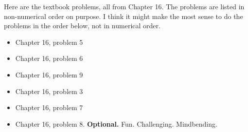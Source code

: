 \documentclass[12pt]{article}
\begin{document}
\noindent Here are the textbook problems, all from Chapter 16.  The
problems are listed in non-numerical order on purpose.  I think it
might make the most sense to do the problems in the order below, not
in numerical order.

\begin{itemize}
  \setlength{\itemsep}{-1mm}
\item Chapter 16, problem 5
\item Chapter 16, problem 6
\item Chapter 16, problem 9
\item Chapter 16, problem 3
\item Chapter 16, problem 7
\item Chapter 16, problem 8. {\bf Optional.} Fun. Challenging. Mindbending. 
\end{itemize}
\end{document}
